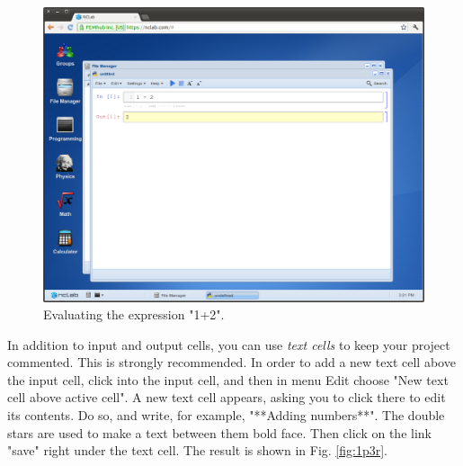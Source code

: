 \documentclass[article,A4,12pt]{llncs}
\begin{document}
\begin{figure}[!ht]
\begin{center}
\includegraphics[width=\textwidth]{img/1p2.png}
\end{center}
\caption{Evaluating the expression "1+2".}
\label{fig:1p3}
\end{figure}
\noindent
\noindent
In addition to input and output cells, you can use {\em text cells}
to keep your project commented. This is strongly recommended. In
order to add a new text cell above the input cell, click into
the input cell, and then in menu Edit choose "New text cell above
active cell". A new text cell appears, asking you to click there to
edit its contents. Do so, and write, for example, "**Adding numbers**".
The double stars are used to make a text between them bold face. 
Then click on the link "save" right under the text cell. The result 
is shown in Fig. \ref{fig:1p3r}.

\newpage
\end{document}
